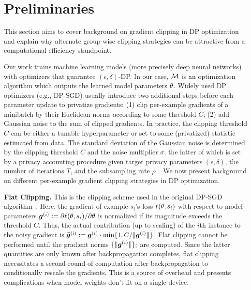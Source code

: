 \section{Preliminaries} \label{sec:preliminary}
This section aims to cover background on gradient clipping in DP optimization and explain why alternate group-wise clipping strategies can be attractive from a computational efficiency standpoint.

Our work trains machine learning models (more precisely deep neural networks) with optimizers that guarantee $(\epsilon, \delta)$-DP.
In our case, $\mathcal{M}$ is an optimization algorithm which outputs the learned model parameters $\mathbf{\theta}$. 
Widely used DP optimizers (e.g., DP-SGD) usually introduce two additional steps before each parameter update to privatize gradients:
(1) clip per-example gradients of a minibatch by their Euclidean norms according to some threshold $C$;
(2) add Gaussian noise to the sum of clipped gradients. 
In practice, the clipping threshold $C$ can be either a tunable hyperparameter or set to some (privatized) statistic estimated from data. 
The standard deviation of the Gaussian noise is determined by the clipping threshold $C$ and the noise multiplier $\sigma$, the latter of which is set by a privacy accounting procedure given target privacy parameters $(\epsilon, \delta)$, the number of iterations $T$, and the subsampling rate $\rho$~\citep{abadi2016deep,mironov2017renyi, dong2019gaussian, gopi2021numerical}. 
We now present background on different per-example gradient clipping strategies in DP optimization.

\textbf{Flat Clipping.}
This is the clipping scheme used in the original DP-SGD algorithm~\citep{abadi2016deep}.
Here, the gradient of example $s_i$'s loss $\ell(\mathbf{\theta}, s_i)$ with respect to model parameters $\bm{g}^{(i)}:= {\partial \ell(\mathbf{\theta}, s_i)} / {\partial \mathbf{\theta}}$ is normalized if its magnitude exceeds the threshold $C$.
Thus, the actual contribution (up to scaling) of the $i$th instance to the noisy gradient is
$\widetilde{\bm{g}}^{(i)} := \bm{g}^{(i)}\cdot \min \{1, C /  {\|\bm{g}^{(i)}\| } \}$.
Flat clipping cannot be performed until the gradient norms $\{\|\bm{g}^{(i)}\|\}_i$ are computed. 
Since the latter quantities are only known after backpropagation completes, flat clipping necessitates a second-round of computation after backpropagation to conditionally rescale the gradients. 
This is a source of overhead and presents complications when model weights don't fit on a single device. 



